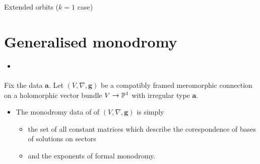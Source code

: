 \begin{frame}{Extended orbits ($k=1$ case)}
  \cite[13]{boalch}
\end{frame}

\section{Generalised monodromy}%
\begin{frame}[t]
  {\Huge\insertsection{}}
  \begin{itemize}
    \item \cite{boalch}
  \end{itemize}
  Fix the data $\textbf{a}$. Let $(V,\nabla,\textbf{g})$ be a compatibly framed
  meromorphic connection on a holomorphic vector bundle $V\to\P^1$ with
  irregular type $\textbf{a}$.

  \begin{itemize}
    \item The monodromy data of of $(V,\nabla,\textbf{g})$ is simply
      \begin{itemize}
        \item the set of all constant matrices which describe the corespondence
          of bases of solutions on sectors
        \item and the exponents of formal monodromy.
      \end{itemize}
  \end{itemize}
\end{frame}

